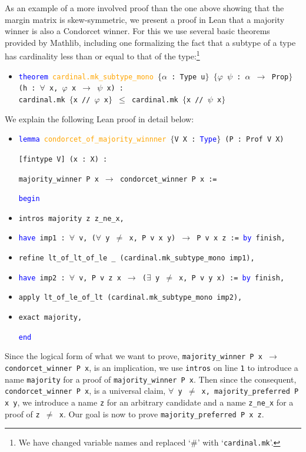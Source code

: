 \documentclass[runningheads]{llncs}
\begin{document}
As an example of a more involved proof than the one above showing that the margin matrix is skew-symmetric, we present a proof in Lean that a majority winner is also a Condorcet winner. For this we use several basic theorems provided by Mathlib, including one formalizing the fact that a subtype of a type has cardinality less than or equal to that of the type:\footnote{We have changed variable names and replaced `$\#$' with `\texttt{cardinal.mk}'.}
\begin{itemize}
\item[] \texttt{\textcolor{blue}{theorem} \textcolor{orange}{cardinal.mk\_subtype\_mono} $\{$$\alpha$ : Type u$\}$ $\{$$\varphi$ $\psi$ : $\alpha$ $\to$ Prop$\}$} \\
\texttt{(h : $\forall$ x, $\varphi$ x $\to$ $\psi$ x) :} \\
\texttt{cardinal.mk $\{$x // $\varphi$ x$\}$ $\leq$ cardinal.mk $\{$x // $\psi$ x$\}$}
\end{itemize}
We explain the following Lean proof in detail below:
\begin{itemize}
\item[] \texttt{\textcolor{blue}{lemma} \textcolor{orange}{condorcet\_of\_majority\_winnner} $\{$V X : \textcolor{blue}{Type}$\}$ (P : Prof V X)}

\texttt{[fintype V] (x : X) :}

\texttt{majority\_winner P x $\to$ condorcet\_winner P x :=}

\textcolor{blue}{\texttt{begin}}

\item[\texttt{1.}]\quad  \texttt{intros majority z z\_ne\_x,}

\item[\texttt{2.}]\quad  \texttt{\textcolor{blue}{have} imp1 : $\forall$ v, ($\forall$ y $\neq$ x, P v x y) $\to$ P v x z := \textcolor{blue}{by} finish,}
  
\item[\texttt{3.}]\quad  \texttt{refine lt\_of\_lt\_of\_le \_ (cardinal.mk\_subtype\_mono imp1),}
 
\item[\texttt{4.}]\quad  \texttt{\textcolor{blue}{have} imp2 : $\forall$ v, P v z x $\to$ ($\exists$ y $\neq$ x, P v y x) := \textcolor{blue}{by} finish,}
  
 \item[\texttt{5.}]\quad  \texttt{apply lt\_of\_le\_of\_lt (cardinal.mk\_subtype\_mono imp2),}
  
\item[\texttt{6.}]\quad  \texttt{exact majority, }
  
\textcolor{blue}{\texttt{end}}
\end{itemize}
Since the logical form of what we want to prove, \texttt{majority\_winner P x $\to$ condorcet\_winner P x}, is an implication, we use \texttt{intros} on line \texttt{1} to introduce a name \texttt{majority} for a proof of \texttt{majority\_winner P x}. Then since the consequent, \texttt{condorcet\_winner P x}, is a universal claim, \texttt{$\forall$ y $\neq$ x, majority\_preferred  P x~y}, we introduce a name \texttt{z} for an arbitrary candidate and a name \texttt{z\_ne\_x} for a proof of \texttt{z $\neq$ x}. Our goal is now to prove \texttt{majority\_preferred P x z}. 
\end{document}
